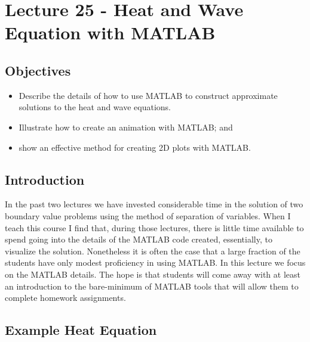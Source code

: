 \chapter{Lecture 25 - Heat and Wave Equation with MATLAB}
\label{ch:lec25}
\section{Objectives}
\begin{itemize}
\item Describe the details of how to use MATLAB to construct approximate solutions to the heat and wave equations.
\item Illustrate how to create an animation with MATLAB; and
\item show an effective method for creating 2D plots with MATLAB.
\end{itemize}
\setcounter{lstannotation}{0} %

\section{Introduction}
In the past two lectures we have invested considerable time in the solution of two boundary value problems using the method of separation of variables.  When I teach this course I find that, during those lectures, there is little time available to spend going into the details of the MATLAB code created, essentially, to visualize the solution. Nonetheless it is often the case that a large fraction of the students have only modest proficiency in using MATLAB.  In this lecture we focus on the MATLAB details.  The hope is that students will come away with at least an introduction to the bare-minimum of MATLAB tools that will allow them to complete homework assignments.

\section{Example Heat Equation}

